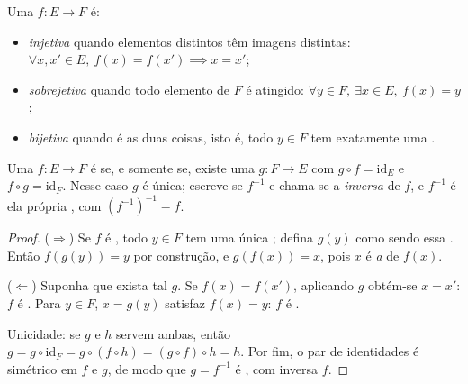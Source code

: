 \begin{definition}\label{def:b1:logic:inj}
Uma  $f \colon E \to F$ é:
\begin{itemize}
  \item \emph{injetiva} quando elementos distintos têm
        imagens distintas: $\forall x, x' \in E,\ f(x) = f(x') \implies
        x = x'$;
  \item \emph{sobrejetiva} quando todo elemento de $F$
        é atingido: $\forall y \in F,\ \exists x \in E,\ f(x) = y$;
  \item \emph{bijetiva} quando é as duas coisas, isto é,
        todo $y \in F$ tem exatamente uma .
\end{itemize}
\end{definition}

\begin{theorem}\label{thm:b1:logic:inverse}
Uma  $f \colon E \to F$ é  se, e somente se, existe uma
 $g \colon F \to E$ com $g \circ f = \mathrm{id}_E$ e $f \circ g =
\mathrm{id}_F$. Nesse caso $g$ é única; escreve-se $f^{-1}$ e
chama-se a \emph{inversa} de $f$, e $f^{-1}$ é ela própria , com
$(f^{-1})^{-1} = f$.
\end{theorem}

\begin{proof}
($\Rightarrow$) Se $f$ é , todo $y \in F$ tem uma única
; defina $g(y)$ como sendo essa . Então $f(g(y)) = y$ por
construção, e $g(f(x)) = x$, pois $x$ é \emph{a}  de
$f(x)$.

($\Leftarrow$) Suponha que exista tal $g$. Se $f(x) = f(x')$, aplicando
$g$ obtém-se $x = x'$: $f$ é . Para $y \in F$, $x = g(y)$
satisfaz $f(x) = y$: $f$ é .

Unicidade: se $g$ e $h$ servem ambas, então $g = g \circ \mathrm{id}_F
= g \circ (f \circ h) = (g \circ f) \circ h = h$. Por fim, o par de
identidades é simétrico em $f$ e $g$, de modo que $g = f^{-1}$ é ,
com inversa $f$.
\end{proof}

